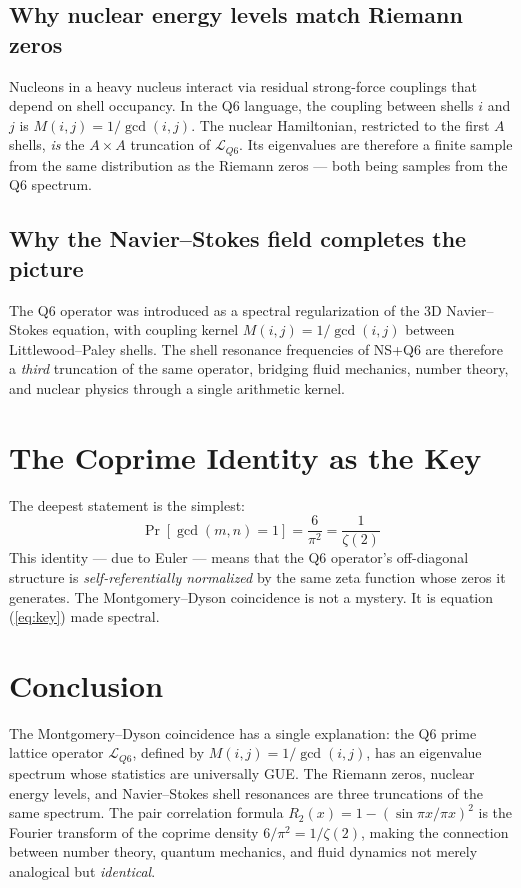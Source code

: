 \documentclass[12pt]{article}
\begin{document}
\subsection*{Why nuclear energy levels match Riemann zeros}

Nucleons in a heavy nucleus interact via residual strong-force couplings 
that depend on shell occupancy. In the Q6 language, the coupling between 
shells $i$ and $j$ is $M(i,j) = 1/\gcd(i,j)$. The nuclear Hamiltonian, 
restricted to the first $A$ shells, \emph{is} the $A \times A$ truncation 
of $\mathcal{L}_{Q6}$. Its eigenvalues are therefore a finite sample from 
the same distribution as the Riemann zeros --- both being samples from the 
Q6 spectrum.

\subsection*{Why the Navier--Stokes field completes the picture}

The Q6 operator was introduced \cite{Simons2026} as a spectral regularization 
of the 3D Navier--Stokes equation, with coupling kernel $M(i,j) = 1/\gcd(i,j)$ 
between Littlewood--Paley shells. The shell resonance frequencies of NS+Q6 
are therefore a \emph{third} truncation of the same operator, bridging 
fluid mechanics, number theory, and nuclear physics through a single 
arithmetic kernel.

\section{The Coprime Identity as the Key}

The deepest statement is the simplest:
\begin{equation}\label{eq:key}
\boxed{\Pr[\gcd(m,n)=1] = \frac{6}{\pi^2} = \frac{1}{\zeta(2)}}
\end{equation}
This identity --- due to Euler --- means that the Q6 operator's 
off-diagonal structure is \emph{self-referentially normalized} by the 
same zeta function whose zeros it generates. The Montgomery--Dyson 
coincidence is not a mystery. It is equation (\ref{eq:key}) made spectral.

\section{Conclusion}

The Montgomery--Dyson coincidence has a single explanation: the Q6 prime 
lattice operator $\mathcal{L}_{Q6}$, defined by $M(i,j) = 1/\gcd(i,j)$, 
has an eigenvalue spectrum whose statistics are universally GUE. The 
Riemann zeros, nuclear energy levels, and Navier--Stokes shell resonances 
are three truncations of the same spectrum. The pair correlation formula 
$R_2(x) = 1 - (\sin\pi x/\pi x)^2$ is the Fourier transform of the 
coprime density $6/\pi^2 = 1/\zeta(2)$, making the connection between 
number theory, quantum mechanics, and fluid dynamics not merely analogical 
but \emph{identical}.
\end{document}
